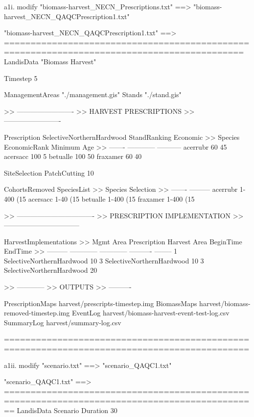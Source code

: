 	a1i. modify "biomass-harvest_NECN_Prescriptions.txt"
		==> "biomass-harvest_NECN_QAQCPrescription1.txt"

"biomass-harvest_NECN_QAQCPrescription1.txt" ==> 
===========================================================================================
LandisData  "Biomass Harvest"


Timestep    5

ManagementAreas 	"./management.gis"
Stands     		 "./stand.gis"



>> -------------------------
>> HARVEST PRESCRIPTIONS
>> -------------------------

Prescription SelectiveNorthernHardwood
    StandRanking    Economic
>>	Species 	EconomicRank	 Minimum Age
>>	------- 	------------ 	-----------
    	acerrubr   	60 	     	45
    	acersacc   	100          	5
    	betualle   	100	     	50
    	fraxamer   	60	     	40

    SiteSelection PatchCutting 10%

    CohortsRemoved SpeciesList
>>	Species		Selection
>>	-------		---------
	acerrubr   	1-400 (15%
	acersacc   	1-40 (15%
	betualle   	1-400 (15%
	fraxamer   	1-400 (15%


    


>> ----------------------------------
>> PRESCRIPTION IMPLEMENTATION 
>> ---------------------------------

    HarvestImplementations
>>	Mgmt Area	Prescription		Harvest Area	BeginTime	EndTime
>> 	---------   	------------   		------------   	---------- 	--------
	1		SelectiveNorthernHardwood	10%
	3		SelectiveNorthernHardwood	10%
	3		SelectiveNorthernHardwood	20%

	
>> ------------
>> OUTPUTS
>> ----------

PrescriptionMaps    harvest/prescripts-{timestep}.img
BiomassMaps         harvest/biomass-removed-{timestep}.img
EventLog            harvest/biomass-harvest-event-test-log.csv
SummaryLog	    harvest/summary-log.csv


============================================================================================


	a1ii. modify "scenario.txt"
		==> "scenario_QAQC1.txt"

"scenario_QAQC1.txt" ==>
==============================================================================================
LandisData  Scenario
Duration  30

